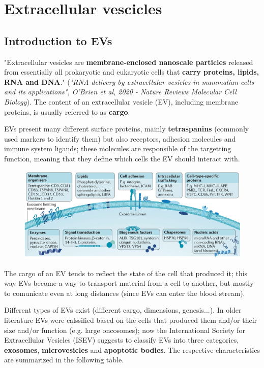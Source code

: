 \chapter{Extracellular vescicles}
\graphicspath{{chapters/TumorEvAndVesciclesImages/}}
\section{Introduction to EVs}

  "Extracellular vesicles are \textbf{membrane-enclosed nanoscale particles} released from essentially all prokaryotic and eukaryotic cells that \textbf{carry proteins, lipids, RNA and DNA}." (\textit{"RNA delivery by extracellular vesicles in mammalian cells and its applications", O’Brien et al, 2020 - Nature Reviews Molecular Cell Biology}). The content of an extracellular vesicle (EV), including membrane proteins, is usually referred to as \textbf{cargo}.

  EVs present many different surface proteins, mainly \textbf{tetraspanins} (commonly used markers to identify them) but also receptors, adhesion molecules and immune system ligands; these molecules are responsible of the targetting function, meaning that they define which cells the EV should interact with. 

  \begin{figure}[H]
  \includegraphics[scale=0.34]{image_07.png}
  \end{figure}
   
  The cargo of an EV tends to reflect the state of the cell that produced it; this way EVs become a way to transport material from a cell to another, but mostly to comunicate even at long distances (since EVs can enter the blood stream).

  Different types of EVs exist (different cargo, dimensions, genesis...). In older literature EVs were calssified based on the cells that produced them and/or their size and/or function (e.g. large oncosomes); now the International Society for Extracellular Vesicles (ISEV) suggests to classify EVs into three categories, \textbf{exosomes}, \textbf{microvesicles} and \textbf{apoptotic bodies}. The respective characteristics are summarized in the following table.
  
